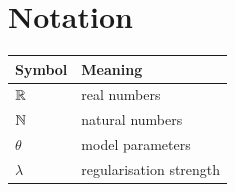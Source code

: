 \chapter*{Notation}
\begin{tabular}{ll}
  \toprule
  Symbol & Meaning \\
  \midrule
  $\mathbb{R}$ & real numbers \\
  $\mathbb{N}$ & natural numbers \\
  $\theta$ & model parameters \\
  $\lambda$ & regularisation strength \\
  \bottomrule
\end{tabular}
\clearpage
